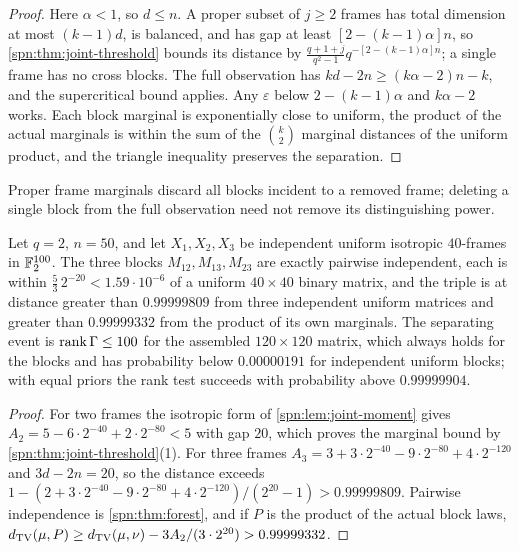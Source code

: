 \begin{proof}
Here $\alpha<1$, so $d\le n$. A proper subset of $j\ge2$ frames has total dimension at most
$(k-1)d$, is balanced, and has gap at least $[2-(k-1)\alpha]n$, so
\cref{spn:thm:joint-threshold} bounds its distance by $\frac{q+1+j}{q^2-1}q^{-[2-(k-1)\alpha]n}$;
a single frame has no cross blocks. The full observation has $kd-2n\ge(k\alpha-2)n-k$, and the
supercritical bound applies. Any $\varepsilon$ below $2-(k-1)\alpha$ and $k\alpha-2$ works. Each block
marginal is exponentially close to uniform, the product of the actual marginals is within the sum of
the $\binom k2$ marginal distances of the uniform product, and the triangle inequality preserves the
separation.
\end{proof}

Proper frame marginals discard all blocks incident to a removed frame; deleting a single block from
the full observation need not remove its distinguishing power.

\begin{example}\label{spn:ex:three-blocks}
Let $q=2$, $n=50$, and let $X_1,X_2,X_3$ be independent uniform isotropic $40$-frames in $\mathbb{F}_2^{100}$.
The three blocks $M_{12},M_{13},M_{23}$ are exactly pairwise independent, each is within
$\frac53\,2^{-20}<1.59\cdot10^{-6}$ of a uniform $40\times40$ binary matrix, and the triple is at
distance greater than $0.99999809$ from three independent uniform matrices and greater than
$0.99999332$ from the product of its own marginals. The separating event is
$\operatorname{rank}\Gamma\le100$ for the assembled $120\times120$ matrix, which always holds for the blocks and has
probability below $0.00000191$ for independent uniform blocks; with equal priors the rank test
succeeds with probability above $0.99999904$.
\end{example}

\begin{proof}
For two frames the isotropic form of \cref{spn:lem:joint-moment} gives
$A_2=5-6\cdot2^{-40}+2\cdot2^{-80}<5$ with gap $20$, which proves the marginal bound by
\cref{spn:thm:joint-threshold}(1). For three frames $A_3=3+3\cdot2^{-40}-9\cdot2^{-80}+4\cdot2^{-120}$ and
$3d-2n=20$, so the distance exceeds
$1-(2+3\cdot2^{-40}-9\cdot2^{-80}+4\cdot2^{-120})/(2^{20}-1)>0.99999809$. Pairwise independence is
\cref{spn:thm:forest}, and if $P$ is the product of the actual block laws,
$d_{\mathrm{TV}}(\mu,P)\ge d_{\mathrm{TV}}(\mu,\nu)-3A_2/(3\cdot2^{20})>0.99999332$.
\end{proof}

